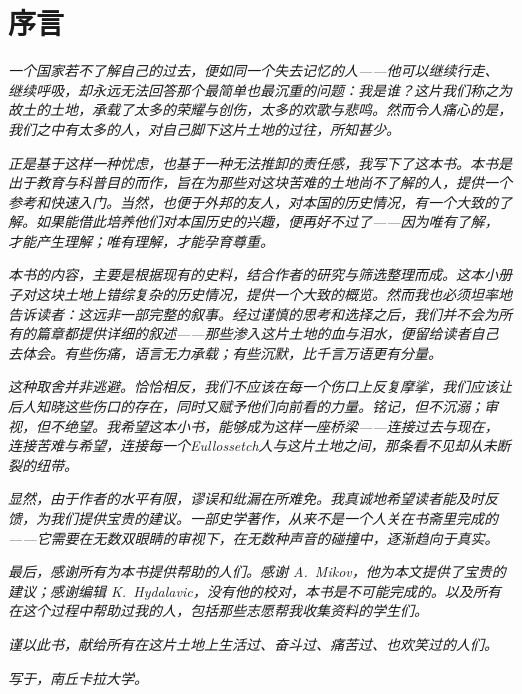 \chapter{序言}

\textit{一个国家若不了解自己的过去，便如同一个失去记忆的人——他可以继续行走、继续呼吸，却永远无法回答那个最简单也最沉重的问题：我是谁？这片我们称之为故土的土地，承载了太多的荣耀与创伤，太多的欢歌与悲鸣。然而令人痛心的是，我们之中有太多的人，对自己脚下这片土地的过往，所知甚少。}

\textit{正是基于这样一种忧虑，也基于一种无法推卸的责任感，我写下了这本书。本书是出于教育与科普目的而作，旨在为那些对这块苦难的土地尚不了解的人，提供一个参考和快速入门。当然，也便于外邦的友人，对本国的历史情况，有一个大致的了解。如果能借此培养他们对本国历史的兴趣，便再好不过了——因为唯有了解，才能产生理解；唯有理解，才能孕育尊重。}

\textit{本书的内容，主要是根据现有的史料，结合作者的研究与筛选整理而成。这本小册子对这块土地上错综复杂的历史情况，提供一个大致的概览。然而我也必须坦率地告诉读者：这远非一部完整的叙事。经过谨慎的思考和选择之后，我们并不会为所有的篇章都提供详细的叙述——那些渗入这片土地的血与泪水，便留给读者自己去体会。有些伤痛，语言无力承载；有些沉默，比千言万语更有分量。}

\textit{这种取舍并非逃避。恰恰相反，我们不应该在每一个伤口上反复摩挲，我们应该让后人知晓这些伤口的存在，同时又赋予他们向前看的力量。铭记，但不沉溺；审视，但不绝望。我希望这本小书，能够成为这样一座桥梁——连接过去与现在，连接苦难与希望，连接每一个Eullossetch人与这片土地之间，那条看不见却从未断裂的纽带。}

\textit{显然，由于作者的水平有限，谬误和纰漏在所难免。我真诚地希望读者能及时反馈，为我们提供宝贵的建议。一部史学著作，从来不是一个人关在书斋里完成的——它需要在无数双眼睛的审视下，在无数种声音的碰撞中，逐渐趋向于真实。}

\textit{最后，感谢所有为本书提供帮助的人们。感谢 A.~Mikov，他为本文提供了宝贵的建议；感谢编辑 K.~Hydalavic，没有他的校对，本书是不可能完成的。以及所有在这个过程中帮助过我的人，包括那些志愿帮我收集资料的学生们。}

\textit{谨以此书，献给所有在这片土地上生活过、奋斗过、痛苦过、也欢笑过的人们。}

\textit{写于，南丘卡拉大学。}
